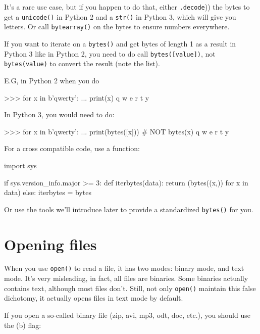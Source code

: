 It's a rare use case, but if you happen to do that, either \lstinline(.decode()) the bytes to get a \lstinline{unicode()} in Python 2 and a \lstinline{str()} in Python 3, which will give you letters. Or call \lstinline{bytearray()} on the bytes to ensure numbers everywhere.

\begin{warning}
If you want to iterate on a \lstinline{bytes()} and get bytes of length 1 as a result in Python 3 like in Python 2, you need to do call \lstinline{bytes([value])}, not \lstinline{bytes(value)} to convert the result (note the list).

E.G, in Python 2 when you do

\begin{py2}
>>> for x in b'qwerty':
...    print(x)
q
w
e
r
t
y

\end{py2}

In Python 3, you would need to do:

\begin{py3}
>>> for x in b'qwerty':
...    print(bytes([x])) # NOT bytes(x)
q
w
e
r
t
y

\end{py3}

For a cross compatible code, use a function:

\begin{py2and3}
import sys

if sys.version_info.major >= 3:
    def iterbytes(data):
        return (bytes((x,)) for x in data)
else:
    iterbytes = bytes
\end{py2and3}

Or use the tools we'll introduce later to provide a standardized \lstinline{bytes()} for you.

\end{warning}

\section{Opening files}

When you use \lstinline{open()} to read a file, it has two modes: binary mode, and text mode. It's very misleading, in fact, all files are binaries. Some binaries actually contains text, although most files don't. Still, not only \lstinline{open()} maintain this false dichotomy, it actually opens files in text mode by default.

If you open a so-called binary file (zip, avi, mp3, odt, doc, etc.), you should use the \textquote(b) flag:

